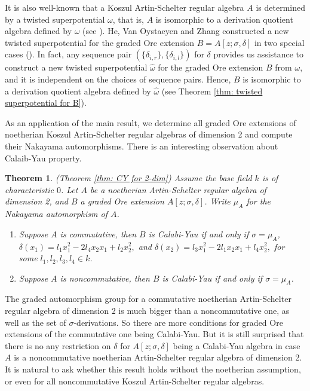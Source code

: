 \documentclass[a4paper,10pt]{amsart}
\newtheorem{theorem}{Theorem}[section]
\theoremstyle{definition}
\numberwithin{equation}{section}
\begin{document}
It is also well-known that a Koszul Artin-Schelter regular algebra $A$ is determined by a twisted superpotential $\omega$, that is, $A$ is isomorphic to a derivation quotient algebra defined by $\omega$ (see \cite{BSW,DV}). He, Van Oystaeyen and Zhang constructed a new twisted superpotential for the graded Ore extension $B=A[z;{\sigma},{\delta}]$ in two special cases (\cite{HVZ,HVZ1}). In fact, any sequence pair $(\{\delta_{i,r}\},\{\delta_{i,l}\})$ for ${\delta}$ provides us assistance to construct  a new twisted superpotential $\hat{\omega}$ for the graded Ore extension $B$ from $\omega$, and it is independent on the choices of sequence pairs. Hence, $B$ is isomorphic to a derivation quotient algebra defined by $\hat{\omega}$ (see Theorem \ref{thm: twisted superpotential for B}).


As an application of the main result, we determine all graded Ore extensions of noetherian Koszul Artin-Schelter regular algebras of dimension 2 and compute their Nakayama automorphisms. There is an interesting observation about Calaib-Yau property.

\begin{theorem}\emph{(Theorem \ref{thm: CY for 2-dim})} Assume the base field $k$ is of characteristic $0$.
Let $A$ be a noetherian Artin-Schelter regular algebra of dimension 2, and $B$ a graded Ore extension $A[z;{\sigma},{\delta}]$. Write $\mu_A$ for the Nakayama automorphism of $A$.
\begin{enumerate}
\item  Suppose $A$ is commutative, then $B$ is Calabi-Yau if and only if ${\sigma}=\mu_A$, $   {\delta}(x_1)=l_1x_1^2-2l_4x_2x_1+l_2x_2^2,$ and $
    {\delta}(x_2)=l_3x_1^2-2l_1x_2x_1+l_4x_2^2,
    $ for some $l_1,l_2,l_3,l_4\in k$.
\item  Suppose $A$ is noncommutative, then $B$ is Calabi-Yau if and only if ${\sigma}=\mu_A$.
\end{enumerate}
\end{theorem}

The graded automorphism group for a commutative noetherian Artin-Schelter regular algebra of dimension 2 is much bigger than a noncommutative one, as well as the set of $\sigma$-derivations. So there are more conditions for graded Ore extensions of the commutative one being Calabi-Yau.  But it is still surprised that there is no any restriction on $\delta$ for $A[z;\sigma,\delta]$ being a Calabi-Yau algebra in case $A$ is a noncommutative noetherian Artin-Schelter regular algebra of dimension 2. It is natural to ask whether this result holds without the noetherian assumption, or even for all noncommutative Koszul Artin-Schelter regular algebras.
\end{document}
